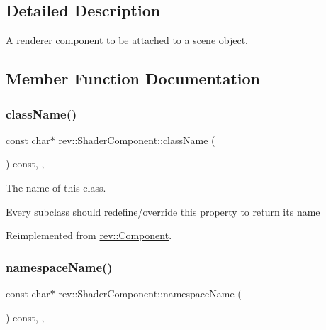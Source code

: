 \subsection{Detailed Description}
A renderer component to be attached to a scene object. 

\subsection{Member Function Documentation}
\mbox{\label{classrev_1_1_shader_component_a62ddc1d5981e4952890a628ca5b6d12a}} 
\subsubsection{\texorpdfstring{className()}{className()}}
{\footnotesize\ttfamily const char$\ast$ rev\+::\+Shader\+Component\+::class\+Name (\begin{DoxyParamCaption}{ }\end{DoxyParamCaption}) const\hspace{0.3cm}{\ttfamily [inline]}, {\ttfamily [override]}, {\ttfamily [virtual]}}



The name of this class. 

Every subclass should redefine/override this property to return its name 

Reimplemented from \mbox{\hyperlink{classrev_1_1_component_a07619152d5acafe7a536df3a6a476349}{rev\+::\+Component}}.

\mbox{\label{classrev_1_1_shader_component_ac052c16eed35e22f62df1d06cf346d55}} 
\subsubsection{\texorpdfstring{namespaceName()}{namespaceName()}}
{\footnotesize\ttfamily const char$\ast$ rev\+::\+Shader\+Component\+::namespace\+Name (\begin{DoxyParamCaption}{ }\end{DoxyParamCaption}) const\hspace{0.3cm}{\ttfamily [inline]}, {\ttfamily [override]}, {\ttfamily [virtual]}}



